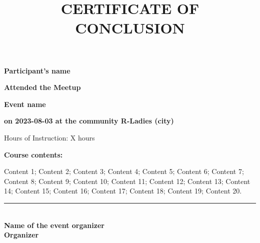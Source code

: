 \documentclass[14pt,landscape]{{extarticle}}
\title{CERTIFICATE OF CONCLUSION}
\author{}
\date{}
\providecommand{\opensans}{\normalfont}
\begin{document}
\opensans

\maketitle

\begin{center}

\LARGE \textbf {
Participant's name
} 

\vspace{1cm}

\normalsize \textbf {
Attended the Meetup 
}

\vspace{0.5cm}

\large \textbf {
Event name 
}


\large \textbf {
on 2023-08-03 at the community R-Ladies (city)
}

\vspace{0.5cm}

\large {
Hours of Instruction: X hours

}

\vspace{0.5cm}

\normalsize \textbf {
Course contents: 
}

\vspace{0.5cm}

\normalsize 
\begin{varwidth}{0.8\textwidth}

Content 1; Content 2; Content 3; Content 4; Content 5; Content 6; Content 7; Content 8; Content 9; Content 10; Content 11; Content 12; Content 13; Content 14; Content 15; Content 16; Content 17; Content 18; Content 19; Content 20.

\end{varwidth}

\vfill

\vspace{0.5cm}



\rule[0in]{3in}{1pt}\\
\textbf{Name of the event organizer\\
        Organizer}\\
\vspace{0.5cm}

\end{center}
\end{document}
